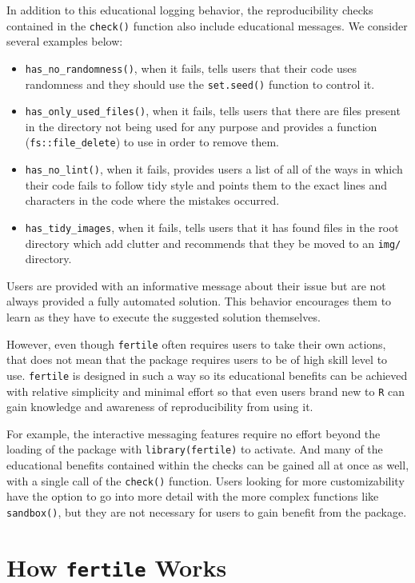 \documentclass[12pt,twoside]{reedthesis}
\begin{document}
In addition to this educational logging behavior, the reproducibility
checks contained in the \texttt{check()} function also include
educational messages. We consider several examples below:
\begin{itemize}
\item
  \texttt{has\_no\_randomness()}, when it fails, tells users that their
  code uses randomness and they should use the \texttt{set.seed()}
  function to control it.
\item
  \texttt{has\_only\_used\_files()}, when it fails, tells users that
  there are files present in the directory not being used for any
  purpose and provides a function (\texttt{fs::file\_delete}) to use in
  order to remove them.
\item
  \texttt{has\_no\_lint()}, when it fails, provides users a list of all
  of the ways in which their code fails to follow tidy style and points
  them to the exact lines and characters in the code where the mistakes
  occurred.
\item
  \texttt{has\_tidy\_images}, when it fails, tells users that it has
  found files in the root directory which add clutter and recommends
  that they be moved to an \texttt{img/} directory.
\end{itemize}
Users are provided with an informative message about their issue but are
not always provided a fully automated solution. This behavior encourages
them to learn as they have to execute the suggested solution themselves.

However, even though \texttt{fertile} often requires users to take their
own actions, that does not mean that the package requires users to be of
high skill level to use. \texttt{fertile} is designed in such a way so
its educational benefits can be achieved with relative simplicity and
minimal effort so that even users brand new to \texttt{R} can gain
knowledge and awareness of reproducibility from using it.

For example, the interactive messaging features require no effort beyond
the loading of the package with \texttt{library(fertile)} to activate.
And many of the educational benefits contained within the checks can be
gained all at once as well, with a single call of the \texttt{check()}
function. Users looking for more customizability have the option to go
into more detail with the more complex functions like
\texttt{sandbox()}, but they are not necessary for users to gain benefit
from the package.

\section{\texorpdfstring{How \texttt{fertile}
Works}{How fertile Works}}\label{how-fertile-works}
\end{document}
